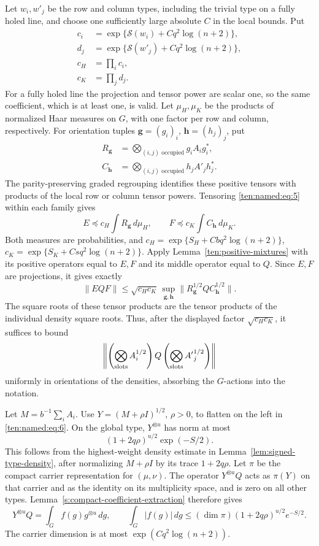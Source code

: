 Let \(w_i,w'_j\) be the row and column types, including the trivial type on a fully holed line, and choose one sufficiently large absolute \(C\) in the local bounds. Put
\[
\begin{aligned}
 c_i&=\exp\{\mathcal S(w_i)+Cq^2\log(n+2)\},\\
 d_j&=\exp\{\mathcal S(w'_j)+Cq^2\log(n+2)\},\\
 c_H&=\prod_i c_i,\\
 c_K&=\prod_j d_j.
\end{aligned}
\]
For a fully holed line the projection and tensor power are scalar one, so the same coefficient, which is at least one, is valid. Let \(\mu_H,\mu_K\) be the products of normalized Haar measures on \(G\), with one factor per row and column, respectively. For orientation tuples \(\mathbf g=(g_i)_i\), \(\mathbf h=(h_j)_j\), put
\[
\begin{aligned}
 R_{\mathbf g}&=\bigotimes_{(i,j)\text{ occupied}}g_i A_i g_i^*,\\
 C_{\mathbf h}&=\bigotimes_{(i,j)\text{ occupied}}h_j A'_j h_j^*.
\end{aligned}
\]
The parity-preserving graded regrouping identifies these positive tensors with products of the local row or column tensor powers. Tensoring \eqref{ten:named:eq:5} within each family gives
\[
 E\preceq c_H\int R_{\mathbf g}\,d\mu_H,\qquad
 F\preceq c_K\int C_{\mathbf h}\,d\mu_K.
\]
Both measures are probabilities, and
\(c_H=\exp\{S_H+Cbq^2\log(n+2)\}\),
\(c_K=\exp\{S_K+Csq^2\log(n+2)\}\).
Apply Lemma~\ref{ten:positive-mixtures} with its positive operators equal to \(E,F\) and its middle operator equal to \(Q\). Since \(E,F\) are projections, it gives exactly
\[
 \|EQF\|\le\sqrt{c_Hc_K}\,
 \sup_{\mathbf g,\mathbf h}
 \|R_{\mathbf g}^{1/2}Q C_{\mathbf h}^{1/2}\|.
\]
The square roots of these tensor products are the tensor products of the individual density square roots. Thus, after the displayed factor \(\sqrt{c_Hc_K}\), it suffices to bound
\begin{equation}
 \left\| \left(\bigotimes_{\rm slots} A_i^{1/2}\right)
        Q
        \left(\bigotimes_{\rm slots} {A'}_j^{1/2}\right)\right\|
 \label{ten:named:eq:6}
\end{equation}
uniformly in orientations of the densities, absorbing the \(G\)-actions into the notation.

Let
\( M=b^{-1}\sum_i A_i\).
Use \(Y=(M+\rho I)^{1/2}\), \(\rho>0\), to flatten on the left in \eqref{ten:named:eq:6}. On the global type, \(Y^{\otimes u}\) has norm at most
\[
 (1+2q\rho)^{u/2}\exp(-S/2).
\]
This follows from the highest-weight density estimate in
Lemma~\ref{lem:signed-type-density}, after normalizing
$M+\rho I$ by its trace $1+2q\rho$. Let $\pi$ be the compact
carrier representation for $(\mu,\nu)$. The operator
$Y^{\otimes u}Q$ acts as $\pi(Y)$ on that carrier and as the
identity on its multiplicity space, and is zero on all other types.
Lemma~\ref{s:compact-coefficient-extraction} therefore gives
\[
 Y^{\otimes u}Q=\int_G f(g)g^{\otimes u}\,dg,
 \qquad
 \int_G|f(g)|\,dg
 \le(\dim\pi)(1+2q\rho)^{u/2}e^{-S/2}.
\]
The carrier dimension is at most
$\exp(Cq^2\log(n+2))$.

